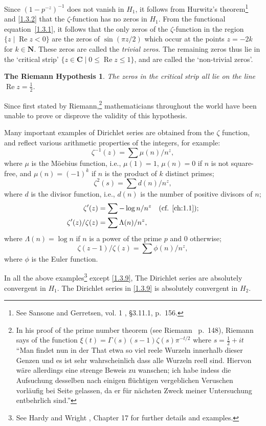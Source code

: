\documentclass[10pt]{article}
\newtheorem{rh}[theo]{The Riemann Hypothesis}
\theoremstyle{definition}
\def\NN{\mathbf{N}}
\def\CC{\mathbf{C}}
\DeclareMathOperator{\re}{Re}
\def\qw#1{`#1'}
\def\fnonze{See Sansone and Gerretsen, vol. 1 \cite{bib:162}, \S3.11.1, p.~156.}
\def\fnonon{In his proof of the prime number theorem (see Riemann~\cite{bib:155} p.~148), Riemann says of the function $\xi(t) = \Gamma(s) (s-1) \zeta(s) \pi^{-t/2}$ where $s = \frac12 + it$ ``Man findet nun in der That etwa so viel reele Wurzeln innerhalb dieser Genzen und es ist sehr wahrscheinlich dass alle Wurzeln reell sind. Hiervon w\"are allerdings eine strenge Beweis zu wanschen; ich habe indess die Aufsuchung desselben nach einigen fl\"uchtigen vergeblichen Veruschen vorl\"aufig bei Seite gelassen, da er f\"ur n\"achsten Zweck meiner Untersuchung entbehrlich sind.''}
\def\fnontw{See Hardy and Wright \cite{bib:86}, Chapter 17 for further details and examples.}
\begin{document}
Since $(1-p^{-z})^{-1}$ does not vanish in $H_1$, it follows from Hurwitz's theorem\footnote{\fnonze} and \ref{1.3.2} that the $\zeta$-function has no zeros in $H_1$.
From the functional equation~\eqref{1.3.1}, it follows that the only zeros of the $\zeta$-function in the region $\{ z \mid \re z < 0 \}$ are the zeros of $\sin(\pi z / 2)$ which occur at the points $z = -2k$ for $k \in \NN$.
These zeros are called the \emph{trivial zeros}.
The remaining zeros thus lie in the \qw{critical strip} $\{z \in \CC \mid 0 \leq \re z \leq 1 \}$, and are called the \qw{non-trivial zeros}.


\begin{rh}
\label{1.3.4}
The zeros in the critical strip all lie on the line $\re z = \frac12$.
\end{rh}


Since first stated by Riemann,\footnote{\fnonon} mathematicians throughout the world have been unable to prove or disprove the validity of this hypothesis.

Many important examples of Dirichlet series are obtained from the $\zeta$ function, and reflect various arithmetic properties of the integers, for example:
\begin{equation}
\label{1.3.5}
\zeta^{-1}(z) = \sum \mu(n) / n^z,
\end{equation}
where $\mu$ is the M\"oebius function, i.e., $\mu(1) = 1$, $\mu(n) = 0$ if $n$ is not square-free, and $\mu(n) = (-1)^k$ if $n$ is the product of $k$ distinct primes;
\begin{equation}
\label{1.3.6}
\zeta^2(s) = \sum d(n) / n^z,
\end{equation}
where $d$ is the divisor function, i.e., $d(n)$ is the number of positive divisors of $n$;
\begin{align}
\label{1.3.7}
\zeta'(z) &= \sum -\log n / n^z
\quad\text{(cf. \ref{ch:1.1})};
\\
\label{1.3.8}
\zeta'(z) / \zeta(z) &= \sum \Lambda(n) / n^z,
\end{align}
where $\Lambda(n) = \log n$ if $n$ is a power of the prime $p$ and $0$ otherwise;
\begin{equation}
\label{1.3.9}
\zeta(z-1)/\zeta(z) = \sum \phi(n) / n^z,
\end{equation}
where $\phi$ is the Euler function.

In all the above examples\footnote{\fnontw} except \eqref{1.3.9}, The Dirichlet series are absolutely convergent in $H_1$.
The Dirichlet series in \eqref{1.3.9} is absolutely convergent in $H_2$.
\end{document}
